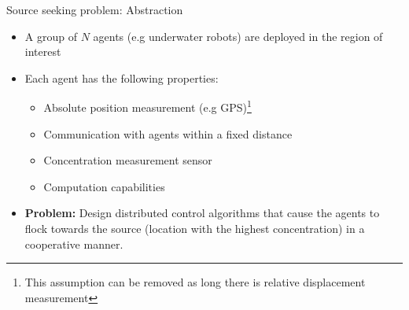 \begin{frame}{Source seeking problem: Abstraction}
	
\begin{itemize}
	\item A group of $N$ agents (e.g underwater robots) are deployed in the region of interest
	\item Each agent has the following properties:
	    \begin{itemize}
	        \item Absolute position measurement (e.g GPS)\footnote{This assumption can be removed as long there is relative displacement measurement}
	        \item Communication with agents within a fixed distance
	        \item Concentration measurement sensor
	        \item Computation capabilities 
	    \end{itemize}
	\item \textbf{Problem:} Design distributed control algorithms that cause the agents to flock towards the source (location with the highest concentration) in a cooperative manner.
\end{itemize}
\end{frame}
